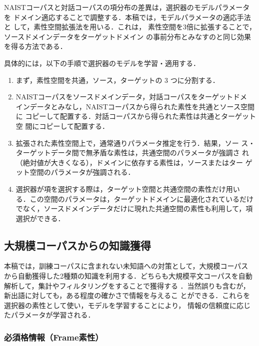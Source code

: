\documentclass[japanese]{jnlp_1.4}
\begin{document}
NAISTコーパスと対話コーパスの項分布の差異は，選択器のモデルパラメータを
ドメイン適応することで調整する．本稿では，モデルパラメータの適応手法と
して，素性空間拡張法\cite{daumeiii:2007:ACLMain}を用いる．これは，
素性空間を3倍に拡張することで，ソースドメインデータをターゲットドメイン
の事前分布とみなすのと同じ効果を得る方法である．

具体的には，以下の手順で選択器のモデルを学習・適用する．

\begin{enumerate}
\item まず，素性空間を共通，ソース，ターゲットの 3 つに分割する．
\item NAISTコーパスをソースドメインデータ，対話コーパスをターゲットドメ
インデータとみなし，NAISTコーパスから得られた素性を共通とソース空間に
コピーして配置する．対話コーパスから得られた素性は共通とターゲット空
間にコピーして配置する．
\item 拡張された素性空間上で，通常通りパラメータ推定を行う．結果，ソー
ス・ターゲットデータ間で無矛盾な素性は，共通空間のパラメータが強調さ
れ（絶対値が大きくなる），ドメインに依存する素性は，ソースまたはター
ゲット空間のパラメータが強調される．
\item 選択器が項を選択する際は，ターゲット空間と共通空間の素性だけ用い
る．この空間のパラメータは，ターゲットドメインに最適化されているだけ
でなく，ソースドメインデータだけに現れた共通空間の素性も利用して，項
選択ができる．
\end{enumerate}


\subsection{大規模コーパスからの知識獲得}
\label{sec-large-resources}

本稿では，訓練コーパスに含まれない未知語への対策として，大規模コーパス
から自動獲得した2種類の知識を利用する．どちらも大規模平文コーパスを自動
解析して，集計やフィルタリングをすることで獲得する
\cite{Kawahara:CaseFrame2005j,sasano-kawahara-kurohashi:2008:PAPERS,sasano-EtAl:2013:EMNLP}
．当然誤りも含むが，新出語に対しても，ある程度の確かさで情報を与えるこ
とができる．これらを選択器の素性として使い，モデルを学習することにより，
情報の信頼度に応じたパラメータが学習される．


\subsubsection{必須格情報（Frame素性）}
\label{sec-case-lex}
\end{document}
